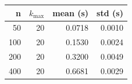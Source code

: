 \begin{tabular}{rrrr}\toprule
n & $k_{\max}$ & mean (s) & std (s)\\\midrule
50 & 20 & 0.0718 & 0.0010\\
100 & 20 & 0.1530 & 0.0024\\
200 & 20 & 0.3200 & 0.0049\\
400 & 20 & 0.6681 & 0.0029\\
\bottomrule\end{tabular}
